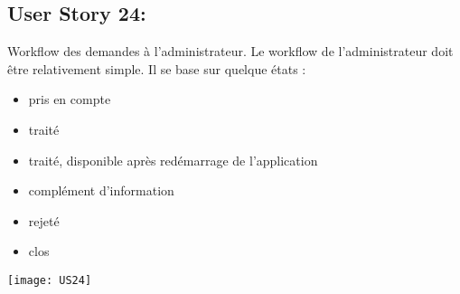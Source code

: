 \newpage{}
\subsection{User Story 24:}
Workflow des demandes à l'administrateur.  Le workflow de l'administrateur doit être relativement
simple. Il se base sur quelque états :

\begin{itemize}
  \item pris en compte
  \item traité
  \item traité, disponible après redémarrage de l'application
  \item complément d'information
  \item rejeté
  \item clos
\end{itemize}


  \begin{center}
        \texttt{[image: US24]}
  \end{center}